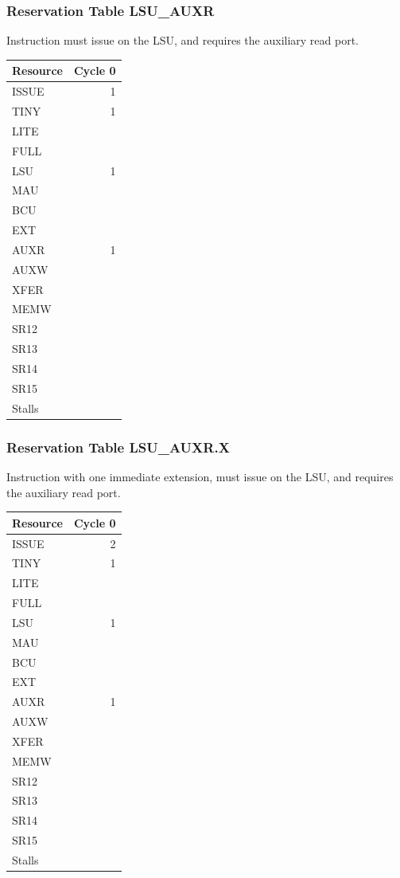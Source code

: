\subsubsection{Reservation Table LSU\_AUXR} \label{sec:reservation-LSU-AUXR}

Instruction must issue on the LSU, and requires the auxiliary read port.
\medskip

\begin{tabular}{|l|r|} \hline
Resource	& Cycle 0 \\ \hline
\textsf{ISSUE}	& 1	\\
\textsf{TINY}	& 1	\\
\textsf{LITE}	& 	\\
\textsf{FULL}	& 	\\
\textsf{LSU}	& 1	\\
\textsf{MAU}	& 	\\
\textsf{BCU}	& 	\\
\textsf{EXT}	& 	\\
\textsf{AUXR}	& 1	\\
\textsf{AUXW}	& 	\\
\textsf{XFER}	& 	\\
\textsf{MEMW}	& 	\\
\textsf{SR12}	& 	\\
\textsf{SR13}	& 	\\
\textsf{SR14}	& 	\\
\textsf{SR15}	& 	\\
\hline Stalls	& 	\\
\hline \end{tabular}

\subsubsection{Reservation Table LSU\_AUXR.X} \label{sec:reservation-LSU-AUXR.X}

Instruction with one immediate extension, must issue on the LSU, and requires the auxiliary read port.
\medskip

\begin{tabular}{|l|r|} \hline
Resource	& Cycle 0 \\ \hline
\textsf{ISSUE}	& 2	\\
\textsf{TINY}	& 1	\\
\textsf{LITE}	& 	\\
\textsf{FULL}	& 	\\
\textsf{LSU}	& 1	\\
\textsf{MAU}	& 	\\
\textsf{BCU}	& 	\\
\textsf{EXT}	& 	\\
\textsf{AUXR}	& 1	\\
\textsf{AUXW}	& 	\\
\textsf{XFER}	& 	\\
\textsf{MEMW}	& 	\\
\textsf{SR12}	& 	\\
\textsf{SR13}	& 	\\
\textsf{SR14}	& 	\\
\textsf{SR15}	& 	\\
\hline Stalls	& 	\\
\hline \end{tabular}

